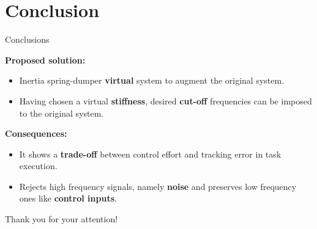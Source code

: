 \documentclass[10pt]{beamer}
\begin{document}
\section{Conclusion}

\begin{frame}{Conclusions}

  \textbf{Proposed solution:} 
  \begin{itemize}
  \item
    Inertia spring-dumper \textbf{virtual} system to augment the original system.
  \item 
    Having chosen a virtual \textbf{stiffness}, desired \textbf{cut-off} frequencies can be imposed
    to the original system.
  \end{itemize}

  \textbf{Consequences:} 
  \begin{itemize}
  \item
    It shows a \textbf{trade-off} between control effort and tracking error in
    task execution.
  \item
    Rejects high frequency signals, namely \textbf{noise} and preserves low frequency ones
    like \textbf{control inputs}.
  \end{itemize}
\end{frame}

{
\begin{frame}[standout]
Thank you for your attention!
\end{frame}
}

\appendix
\end{document}
